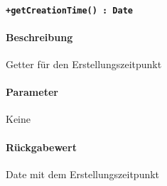\paragraph{\texttt{+getCreationTime() : Date}}%
\paragraph*{Beschreibung}
Getter für den Erstellungszeitpunkt
\paragraph*{Parameter}
Keine
\paragraph*{Rückgabewert}
Date mit dem Erstellungszeitpunkt